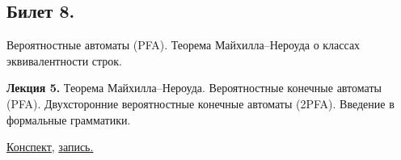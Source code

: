\documentclass[a4paper]{article}
\newcommand{\mybox}{%
    \collectbox{%
        \setlength{\fboxsep}{1pt}%
        \fbox{\BOXCONTENT}%
    }%
}
\theoremstyle{indented}
\theoremstyle{definition}
\theoremstyle{remark}
\begin{document}
\subsection{Билет 8.}

Вероятностные автоматы (PFA). Теорема Майхилла–Нероуда о классах эквивалентности строк.

\hrulefill

\textbf{Лекция 5.} Теорема Майхилла–Нероуда. Вероятностные конечные автоматы (PFA). Двухсторонние вероятностные конечные автоматы (2PFA). Введение в формальные грамматики.

\begin{flushright}
    \mybox{
        \href{https://users.math-cs.spbu.ru/~okhotin/teaching/tcs_fl_2021/okhotin_tcs_fl_2021_l5.pdf}{Конспект,}
        \href{https://disk.yandex.ru/d/knoQ44wLmGDwwQ/2021-2022%20учебный%20год%20(осенний%20семестр)/2%20курс/Теоретическая%20информатика/M2021-09-29_111630_1h44m_102.mp4}{запись.}
    }
\end{flushright}
\end{document}
